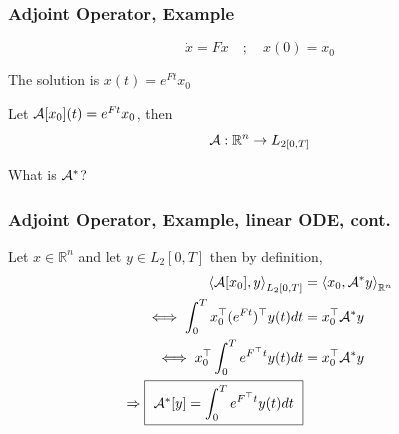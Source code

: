 \documentclass{beamer}
\begin{document}
\begin{frame}\frametitle{Adjoint Operator, Example}
	\begin{example}
		\[ \dot{x} = Fx \quad ; \quad x(0) = x_0 \]
		
		\vfill
		
		The solution is $x(t) = e^{Ft}x_0$
		
		\vfill
		
		Let $\mathcal{A}[x_0](t) = e^{Ft}x_0$, then
		\[ \mathcal{A}:\mathbb{R}^n \to L_{2[0,T]} \]
		
		\vfill 
		
		What is $\mathcal{A}^\ast$?
	\end{example}
\end{frame}

\begin{frame}\frametitle{Adjoint Operator, Example, linear ODE, cont.}
	Let $x \in \mathbb{R}^n$ and let $y \in L_2[0,T]$ then by definition,
		\begin{align*}
			\left<\mathcal{A}[x_0],y \right>_{L_2[0,T]} &= \left<x_0, \mathcal{A}^\ast y \right>_{\mathbb{R}^n} \\
			\iff \int_0^T x_0^\top(e^{Ft})^\top y(t)dt &= x_0^\top \mathcal{A}^\ast y \\
			\iff x_0^\top \int_0^T e^{F^\top t}y(t) dt &= x_0^\top \mathcal{A}^\ast y \\
			\Rightarrow \fbox{ $\mathcal{A}^\ast[y] = \displaystyle \int_0^Te^{F^\top t}y(t)dt $ }\\
		\end{align*}
\end{frame}
\end{document}
